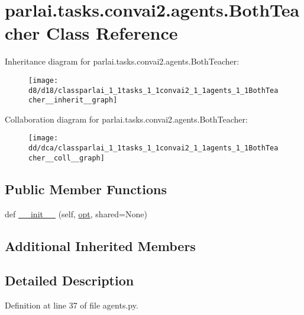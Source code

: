 \hypertarget{classparlai_1_1tasks_1_1convai2_1_1agents_1_1BothTeacher}{}\section{parlai.\+tasks.\+convai2.\+agents.\+Both\+Teacher Class Reference}
\label{classparlai_1_1tasks_1_1convai2_1_1agents_1_1BothTeacher}


Inheritance diagram for parlai.\+tasks.\+convai2.\+agents.\+Both\+Teacher\+:
\nopagebreak
\begin{figure}[H]
\begin{center}
\leavevmode
\texttt{[image: d8/d18/classparlai\_1\_1tasks\_1\_1convai2\_1\_1agents\_1\_1BothTeacher\_\_inherit\_\_graph]}
\end{center}
\end{figure}


Collaboration diagram for parlai.\+tasks.\+convai2.\+agents.\+Both\+Teacher\+:
\nopagebreak
\begin{figure}[H]
\begin{center}
\leavevmode
\texttt{[image: dd/dca/classparlai\_1\_1tasks\_1\_1convai2\_1\_1agents\_1\_1BothTeacher\_\_coll\_\_graph]}
\end{center}
\end{figure}
\subsection*{Public Member Functions}
\begin{DoxyCompactItemize}
\item 
def \hyperlink{classparlai_1_1tasks_1_1convai2_1_1agents_1_1BothTeacher_acae96b99b1aa547acb06ee854936e50b}{\+\_\+\+\_\+init\+\_\+\+\_\+} (self, \hyperlink{classparlai_1_1core_1_1teachers_1_1FbDialogTeacher_af7a9ec497b9cd0292d7b8fa220da7c28}{opt}, shared=None)
\end{DoxyCompactItemize}
\subsection*{Additional Inherited Members}


\subsection{Detailed Description}


Definition at line 37 of file agents.\+py.



